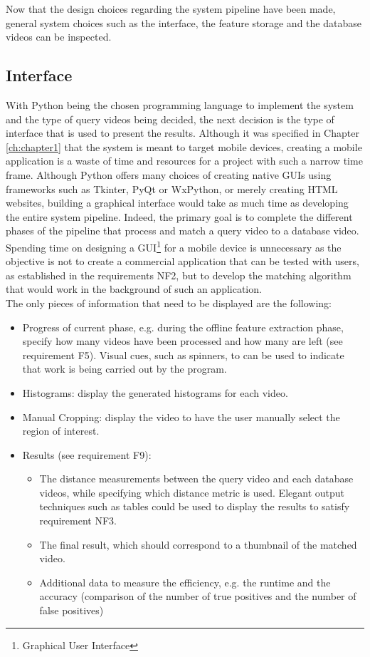 Now that the design choices regarding the system pipeline have been made, general system choices such as the interface, the feature storage and the database videos can be inspected.


\subsection{Interface}

With Python being the chosen programming language to implement the system and the type of query videos being decided, the next decision is the type of interface that is used to present the results. Although it was specified in Chapter \ref{ch:chapter1} that the system is meant to target mobile devices, creating a mobile application is a waste of time and resources for a project with such a narrow time frame. Although Python offers many choices of creating native GUIs using frameworks such as Tkinter, PyQt or WxPython, or merely creating HTML websites, building a graphical interface would take as much time as developing the entire system pipeline. Indeed, the primary goal is to complete the different phases of the pipeline that process and match a query video to a database video. Spending time on designing a GUI\footnote{Graphical User Interface} for a mobile device is unnecessary as the objective is not to create a commercial application that can be tested with users, as established in the requirements NF2, but to develop the matching algorithm that would work in the background of such an application.\\

The only pieces of information that need to be displayed are the following:
\begin{itemize}
    \item Progress of current phase, e.g. during the offline feature extraction phase, specify how many videos have been processed and how many are left (see requirement F5). Visual cues, such as spinners, to can be used to indicate that work is being carried out by the program.
    \item Histograms: display the generated histograms for each video.
    \item Manual Cropping: display the video to have the user manually select the region of interest.
    \item Results (see requirement F9):
    \begin{itemize}
        \item The distance measurements between the query video and each database videos, while specifying which distance metric is used. Elegant output techniques such as tables could be used to display the results to satisfy requirement NF3.
        \item The final result, which should correspond to a thumbnail of the matched video.
        \item Additional data to measure the efficiency, e.g. the runtime and the accuracy (comparison of the number of true positives and the number of false positives)
    \end{itemize}
\end{itemize}

